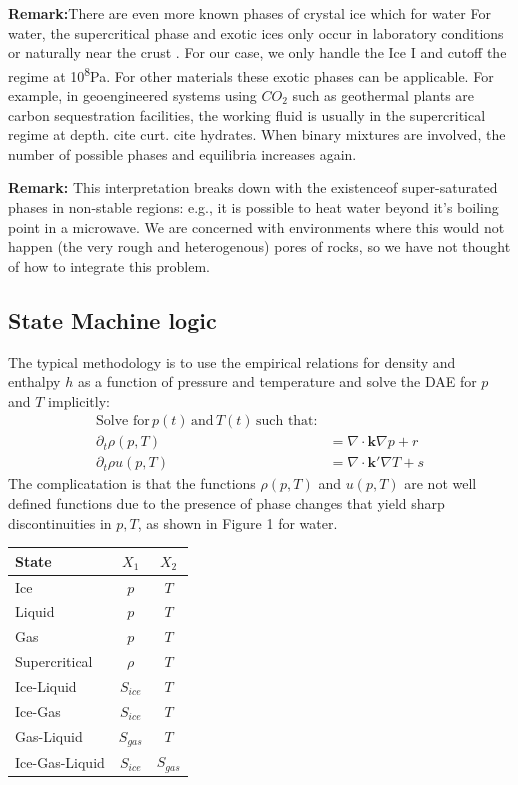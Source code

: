 \documentclass[]{article}
\begin{document}
{\bf Remark:}There are even more known phases of crystal ice which for water
For water, the supercritical phase and exotic ices only occur in
laboratory conditions or naturally near the
crust \cite{}. For our case, we only handle the Ice I and cutoff the
regime at \si{10^8}{Pa}. For other materials these exotic phases can be
applicable. For example, in geoengineered systems using $CO_2$
such as geothermal plants are carbon sequestration facilities, the
working fluid is usually in the supercritical regime at depth. cite
curt. cite hydrates.
When binary mixtures are involved, the number of possible phases and
equilibria increases again.

{\bf Remark:} This interpretation breaks down with the existenceof super-saturated phases in non-stable regions: e.g., it is possible to
heat water beyond it's boiling point in a microwave. We are concerned
with environments where this would not happen (the very rough and
heterogenous) pores of rocks, so we have not thought of how to
integrate this problem.

\hypertarget{header-n3253}{%
\subsection{State Machine logic}\label{header-n3253}}


The typical methodology is to use the empirical relations for density
and enthalpy \(h\) as a function of pressure and temperature and solve
the DAE for \(p\) and \(T\) implicitly:
\begin{align}
\text{Solve for}\, p(t)\, \text{and}\, T(t)\, \text{such that:}\\
\partial_t \rho(p,T) & = \nabla \cdot \mathbf{k}\nabla p + r\\
\partial_t \rho u(p,T) & = \nabla \cdot \mathbf{k'}\nabla T + s
\end{align}
The complicatation is that the functions \(\rho(p,T)\) and \(u(p,T)\)
are not well defined functions due to the presence of phase changes that
yield sharp discontinuities in \(p,T\), as shown in Figure 1 for
water.



\begin{tabular}{l|c|c}
  State & $X_1$ & $X_2$ \\
  \hline
  Ice & $p$ & $T$ \\
  Liquid & $p$ & $T$ \\
  Gas & $p$ & $T$ \\
  Supercritical & $\rho$ & $T$ \\
  Ice-Liquid & $S_{ice}$ & $T$ \\
  Ice-Gas & $S_{ice}$ & $T$ \\
  Gas-Liquid & $S_{gas}$ & $T$ \\
  Ice-Gas-Liquid & $S_{ice}$ & $S_{gas}$ 
\end{tabular}
\end{document}
